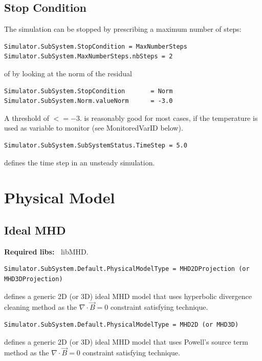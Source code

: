 \documentclass[11pt]{article}
\begin{document}
\subsection{Stop Condition}

The simulation can be stopped by prescribing a maximum number of steps:

\begin{lstlisting}[breaklines]
Simulator.SubSystem.StopCondition = MaxNumberSteps
Simulator.SubSystem.MaxNumberSteps.nbSteps = 2
\end{lstlisting}
of by looking at the norm of the residual

\begin{lstlisting}[breaklines]
Simulator.SubSystem.StopCondition       = Norm
Simulator.SubSystem.Norm.valueNorm      = -3.0
\end{lstlisting}
A threshold of $<= -3.$ is reasonably good for most cases, if the temperature is used as variable to monitor (see MonitoredVarID below).

\begin{lstlisting}[breaklines]
Simulator.SubSystem.SubSystemStatus.TimeStep = 5.0
\end{lstlisting}
defines the time step in an unsteady simulation.

\section{Physical Model}

\subsection{Ideal MHD}

{\bf Required libs:~} libMHD.

\begin{lstlisting}[breaklines]
Simulator.SubSystem.Default.PhysicalModelType = MHD2DProjection (or MHD3DProjection)
\end{lstlisting}
defines a generic 2D (or 3D) ideal MHD model that uses hyperbolic divergence cleaning method as the $\nabla\cdot\vec{B}=0$ constraint satisfying technique.

\begin{lstlisting}[breaklines]
Simulator.SubSystem.Default.PhysicalModelType = MHD2D (or MHD3D)
\end{lstlisting}
defines a generic 2D (or 3D) ideal MHD model that uses Powell's source term method as the $\nabla\cdot\vec{B}=0$ constraint satisfying technique.
\end{document}

